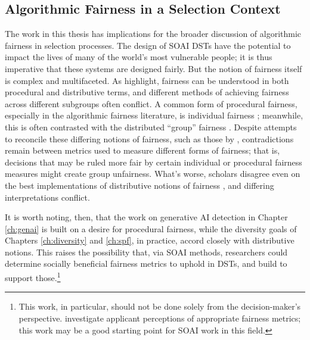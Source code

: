 \subsection{Algorithmic Fairness in a Selection Context}
The work in this thesis has implications for the broader discussion of algorithmic fairness in selection processes. The design of SOAI DSTs have the potential to impact the lives of many of the world's most vulnerable people; it is thus imperative that these systems are designed fairly. But the notion of fairness itself is complex and multifaceted. As \textcite{pmlr-v80-kearns18a} highlight, fairness can be understood in both procedural and distributive terms, and different methods of achieving fairness across different subgroups often conflict. A common form of procedural fairness, especially in the algorithmic fairness literature, is individual fairness \cite{dwork_fairness_2012}; meanwhile, this is often contrasted with the distributed ``group'' fairness \cite{fleisher_whats_nodate,binns_apparent_2019,barocas2023fairness,Friedler_Scheidegger_Venkatasubramanian_2016}. Despite attempts to reconcile these differing notions of fairness, such as those by \textcite{binns_apparent_2019}, contradictions remain between metrics used to measure different forms of fairness; that is, decisions that may be ruled more fair by certain individual or procedural fairness measures might create group unfairness. What's worse, scholars disagree even on the best implementations of distributive notions of fairness \cite{Friedler_Scheidegger_Venkatasubramanian_2016}, and differing interpretations conflict. 

It is worth noting, then, that the work on generative AI detection in Chapter \ref{ch:genai} is built on a desire for procedural fairness, while the diversity goals of Chapters \ref{ch:diversity} and \ref{ch:spf}, in practice, accord closely with distributive notions. This raises the possibility that, via SOAI methods, researchers could determine socially beneficial fairness metrics to uphold in DSTs, and build to support those.\footnote{This work, in particular, should not be done solely from the decision-maker's perspective. \textcite{10.1145/3351095.3372867} investigate applicant perceptions of appropriate fairness metrics; this work may be a good starting point for SOAI work in this field.}


